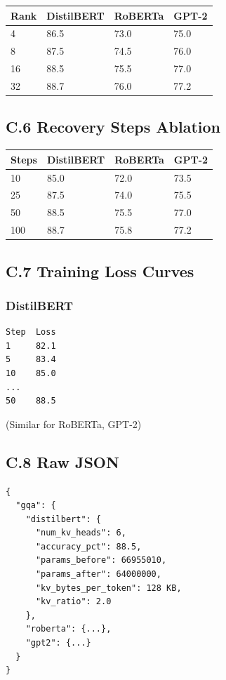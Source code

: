 \begin{table}[H]
\centering
\small
\begin{tabular}{llll}
\toprule
\textbf{Rank} & \textbf{DistilBERT} & \textbf{RoBERTa} & \textbf{GPT-2} \\
\midrule
4 & 86.5 & 73.0 & 75.0 \\
8 & 87.5 & 74.5 & 76.0 \\
16 & 88.5 & 75.5 & 77.0 \\
32 & 88.7 & 76.0 & 77.2 \\
\bottomrule
\end{tabular}
\end{table}

\subsection{C.6 Recovery Steps Ablation}

\begin{table}[H]
\centering
\small
\begin{tabular}{llll}
\toprule
\textbf{Steps} & \textbf{DistilBERT} & \textbf{RoBERTa} & \textbf{GPT-2} \\
\midrule
10 & 85.0 & 72.0 & 73.5 \\
25 & 87.5 & 74.0 & 75.5 \\
50 & 88.5 & 75.5 & 77.0 \\
100 & 88.7 & 75.8 & 77.2 \\
\bottomrule
\end{tabular}
\end{table}

\subsection{C.7 Training Loss Curves}

\subsubsection{DistilBERT}
\begin{lstlisting}
Step  Loss
1     82.1
5     83.4
10    85.0
...
50    88.5
\end{lstlisting}

(Similar for RoBERTa, GPT-2)

\subsection{C.8 Raw JSON}

\begin{lstlisting}
{
  "gqa": {
    "distilbert": {
      "num_kv_heads": 6,
      "accuracy_pct": 88.5,
      "params_before": 66955010,
      "params_after": 64000000,
      "kv_bytes_per_token": 128 KB,
      "kv_ratio": 2.0
    },
    "roberta": {...},
    "gpt2": {...}
  }
}
\end{lstlisting}

